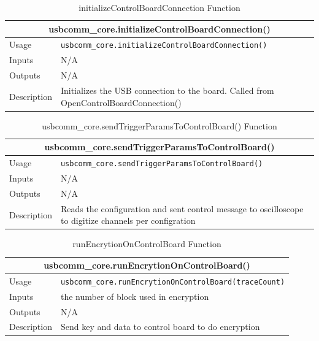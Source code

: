 \documentclass{llncs}
\numberwithin{algorithm}{chapter}
\begin{document}
\begin{table}
\caption{initializeControlBoardConnection Function}
\begin{tabular}{ |p{2cm}||p{11cm}|  }
 \hline
 \multicolumn{2}{|c|}{\cellcolor{teal}\textbf{usbcomm\_core.initializeControlBoardConnection()}} \\
 \hline
 Usage & \texttt{usbcomm\_core.initializeControlBoardConnection()}\\ \hline
 Inputs & N/A \\ \hline
 Outputs &  N/A \\ \hline
 Description & Initializes the USB connection to the board.
Called from OpenControlBoardConnection() \\ \hline
\end{tabular}
\end{table}


\begin{table}
\caption{usbcomm\_core.sendTriggerParamsToControlBoard() Function}
\begin{tabular}{ |p{2cm}||p{11cm}|  }
 \hline
 \multicolumn{2}{|c|}{\cellcolor{teal}\textbf{usbcomm\_core.sendTriggerParamsToControlBoard()}} \\
 \hline
 Usage & \texttt{usbcomm\_core.sendTriggerParamsToControlBoard()}\\ \hline
 Inputs & N/A \\ \hline
 Outputs &  N/A \\ \hline
 Description & Reads the configuration and sent control message to oscilloscope to digitize channels per configration \\ \hline
\end{tabular}
\end{table}

\begin{table}
\caption{runEncrytionOnControlBoard Function}
\begin{tabular}{ |p{2cm}||p{11cm}|  }
 \hline
 \multicolumn{2}{|c|}{\cellcolor{teal}\textbf{usbcomm\_core.runEncrytionOnControlBoard()}} \\
 \hline
 Usage & \texttt{usbcomm\_core.runEncrytionOnControlBoard(traceCount)}\\ \hline
 Inputs & the number of block used in encryption \\ \hline
 Outputs &  N/A \\ \hline
 Description & Send key and data to control board to do encryption \\ \hline
\end{tabular}
\end{table}
\end{document}
